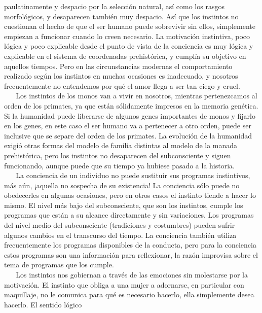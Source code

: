 paulatinamente y despacio por la selección natural, así como los rasgos
morfológicos, y desaparecen también muy despacio. Así que los instintos
no cuestionan el hecho de que el ser humano puede sobrevivir sin ellos,
simplemente empiezan a funcionar cuando lo creen necesario. La
motivación instintiva, poco lógica y poco explicable desde el punto de
vista de la conciencia es muy lógica y explicable en el sistema de
coordenadas prehistórica, y cumplía su objetivo en aquellos tiempos.
Pero en las circunstancias modernas el comportamiento realizado según
los instintos en muchas ocasiones es inadecuado, y nosotros
frecuentemente no entendemos por qué el amor llega a ser tan ciego y
cruel.\\
\hspace*{0.333em} ~ ~ Los instintos de los monos van a vivir en
nosotros, mientras pertenezcamos al orden de los primates, ya que están
sólidamente impresos en la memoria genética. Si la humanidad puede
liberarse de algunos genes importantes de monos y fijarlo en los genes,
en este caso el ser humano va a pertenecer a otro orden, puede ser
inclusive que se separe del orden de los primates. La evolución de la
humanidad exigió otras formas del modelo de familia distintas al modelo
de la manada prehistórica, pero los instintos no desaparecen del
subconsciente y siguen funcionando, aunque puede que su tiempo ya
hubiese pasado a la historia.\\
\hspace*{0.333em} ~ ~ La conciencia de un individuo no puede sustituir
sus programas instintivos, más aún, ¡aquella no sospecha de su
existencia! La conciencia sólo puede no obedecerles en algunas
ocasiones, pero en otros casos el instinto tiende a hacer lo mismo. El
nivel más bajo del subconsciente, que son los instintos, cumple los
programas que están a su alcance directamente y sin variaciones. Los
programas del nivel medio del subconsciente (tradiciones y costumbres)
pueden sufrir algunos cambios en el transcurso del tiempo. La conciencia
también utiliza frecuentemente los programas disponibles de la conducta,
pero para la conciencia estos programas son una información para
reflexionar, la razón improvisa sobre el tema de programas que los
cumple.\\
\hspace*{0.333em} ~ ~ Los instintos nos gobiernan a través de las
emociones sin molestarse por la motivación. El instinto que obliga a una
mujer a adornarse, en particular con maquillaje, no le comunica para qué
es necesario hacerlo, ella simplemente desea hacerlo. El sentido lógico
